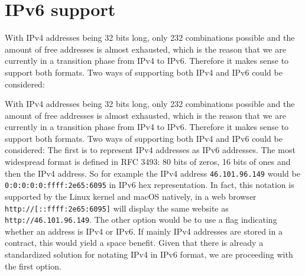 \section{IPv6 support}

With IPv4 addresses being 32 bits long, only 232 combinations possible and the amount of free addresses is almost exhausted, which is the reason that we are currently in a transition phase from IPv4 to IPv6. Therefore it makes sense to support both formats. Two ways of supporting both IPv4 and IPv6 could be considered:

With IPv4 addresses being 32 bits long, only 232 combinations possible and the amount of free addresses is almost exhausted, which is the reason that we are currently in a transition phase from IPv4 to IPv6. Therefore it makes sense to support both formats. Two ways of supporting both IPv4 and IPv6 could be considered:
The first is to represent IPv4 addresses as IPv6 addresses. The most widespread format is defined in RFC 3493: 80 bits of zeros, 16 bits of ones and then the IPv4 address. So for example the IPv4 address \texttt{46.101.96.149} would be \texttt{0:0:0:0:0:ffff:2e65:6095} in IPv6 hex representation. In fact, this notation is supported by the Linux kernel and macOS natively, in a web browser \texttt{http://[::ffff:2e65:6095]} will display the same website as \texttt{http://46.101.96.149}.
The other option would be to use a flag indicating whether an address is IPv4 or IPv6. If mainly IPv4 addresses are stored in a contract, this would yield a space benefit.
Given that there is already a standardized solution for notating IPv4 in IPv6 format, we are proceeding with the first option.

